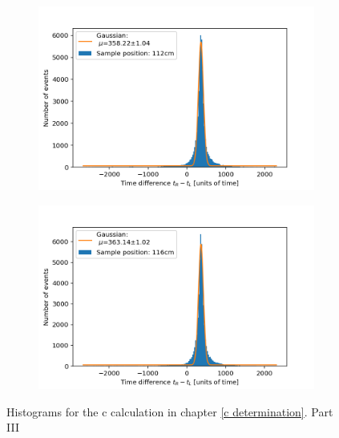 \documentclass[]{article}
\begin{document}
\begin{figure}[H]
\medskip
\begin{subfigure}{0.48\textwidth}
\includegraphics[width=\linewidth]{Plots/Pos/112cm.png}
\end{subfigure}
\begin{subfigure}[c]{0.48\linewidth}
\includegraphics[width=\linewidth]{Plots/Pos/116cm.png}
\end{subfigure}
\caption{Histograms for the c calculation in chapter \ref{c determination}. Part III }
\end{figure}
\end{document}
